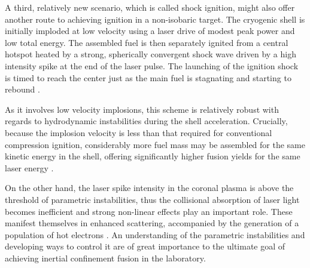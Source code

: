 A third, relatively new scenario, which is called shock ignition, might also offer another route to achieving ignition in a non-isobaric target. The cryogenic shell is initially imploded at low velocity using a laser drive of modest peak power and low total energy. The assembled fuel is then separately ignited from a central hotspot heated by a strong, spherically convergent shock wave driven by a high intensity spike at the end of the laser pulse. The launching of the ignition shock is timed to reach the center just as the main fuel is stagnating and starting to rebound \cite{theobald}.

As it involves low velocity implosions, this scheme is relatively robust with regards to hydrodynamic instabilities during the shell acceleration. Crucially, because the implosion velocity is less than that required for conventional compression ignition, considerably more fuel mass may be assembled for the same kinetic energy in the shell, offering significantly higher fusion yields for the same laser energy \cite{batani}.

On the other hand, the laser spike intensity in the coronal plasma is above the threshold of parametric instabilities, thus the collisional absorption of laser light becomes inefficient and strong non-linear effects play an important role. These manifest themselves in enhanced scattering, accompanied by the generation of a population of hot electrons \cite{klimo3}. An understanding of the parametric instabilities and developing ways to control it are of great importance to the ultimate goal of achieving inertial confinement fusion in the laboratory.
